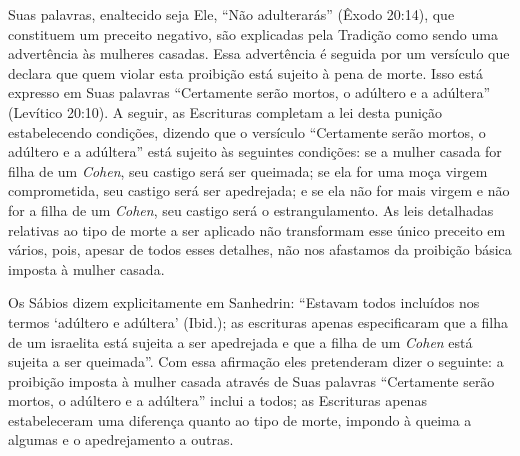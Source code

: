 Suas palavras, enaltecido seja Ele, ``Não adulterarás'' (Êxodo 20:14),
que constituem um preceito negativo, são explicadas pela Tradição como
sendo uma advertência às mulheres casadas. Essa advertência é seguida
por um versículo que declara que quem violar esta proibição está sujeito
à pena de morte. Isso está expresso em Suas palavras ``Certamente serão
mortos, o adúltero e a adúltera'' (Levítico 20:10). A seguir, as
Escrituras completam a lei desta punição estabelecendo condições,
dizendo que o versículo ``Certamente serão mortos, o adúltero e a
adúltera'' está sujeito às seguintes condições: se a mulher casada for
filha de um \textit{Cohen}, seu castigo será ser queimada; se ela for uma
moça virgem comprometida, seu castigo será ser apedrejada; e se ela não
for mais virgem e não for a filha de um \textit{Cohen}, seu castigo será o
estrangulamento. As leis detalhadas relativas ao tipo de morte a ser
aplicado não transformam esse único preceito em vários, pois, apesar de
todos esses detalhes, não nos afastamos da proibição básica imposta à
mulher casada.

Os Sábios dizem explicitamente em Sanhedrin: ``Estavam todos incluídos
nos termos `adúltero e adúltera' (Ibid.); as escrituras apenas
especificaram que a filha de um israelita está sujeita a ser apedrejada
e que a filha de um \textit{Cohen} está sujeita a ser queimada''. Com essa
afirmação eles pretenderam dizer o seguinte: a proibição imposta à
mulher casada através de Suas palavras ``Certamente serão mortos, o
adúltero e a adúltera'' inclui a todos; as Escrituras apenas
estabeleceram uma diferença quanto ao tipo de morte, impondo à queima a
algumas e o apedrejamento a outras.

